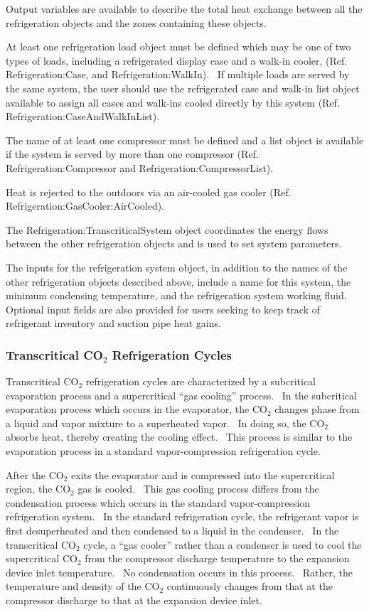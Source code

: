 Output variables are available to describe the total heat exchange between all the refrigeration objects and the zones containing these objects.

At least one refrigeration load object must be defined which may be one of two types of loads, including a refrigerated display case and a walk-in cooler, (Ref. Refrigeration:Case, and Refrigeration:WalkIn).~ If multiple loads are served by the same system, the user should use the refrigerated case and walk-in list object available to assign all cases and walk-ins cooled directly by this system (Ref. Refrigeration:CaseAndWalkInList).

The name of at least one compressor must be defined and a list object is available if the system is served by more than one compressor (Ref. Refrigeration:Compressor and Refrigeration:CompressorList).

Heat is rejected to the outdoors via an air-cooled gas cooler (Ref. Refrigeration:GasCooler:AirCooled).

The Refrigeration:TranscriticalSystem object coordinates the energy flows between the other refrigeration objects and is used to set system parameters.

The inputs for the refrigeration system object, in addition to the names of the other refrigeration objects described above, include a name for this system, the minimum condensing temperature, and the refrigeration system working fluid.~ Optional input fields are also provided for users seeking to keep track of refrigerant inventory and suction pipe heat gains.

\subsubsection{Transcritical CO\(_{2}\) Refrigeration Cycles}\label{transcritical-co2-refrigeration-cycles}

Transcritical CO\(_{2}\) refrigeration cycles are characterized by a subcritical evaporation process and a supercritical ``gas cooling'' process.~ In the subcritical evaporation process which occurs in the evaporator, the CO\(_{2}\) changes phase from a liquid and vapor mixture to a superheated vapor.~ In doing so, the CO\(_{2}\) absorbs heat, thereby creating the cooling effect.~ This process is similar to the evaporation process in a standard vapor-compression refrigeration cycle.

After the CO\(_{2}\) exits the evaporator and is compressed into the supercritical region, the CO\(_{2}\) gas is cooled.~ This gas cooling process differs from the condensation process which occurs in the standard vapor-compression refrigeration system.~ In the standard refrigeration cycle, the refrigerant vapor is first desuperheated and then condensed to a liquid in the condenser.~ In the transcritical CO\(_{2}\) cycle, a ``gas cooler'' rather than a condenser is used to cool the supercritical CO\(_{2}\) from the compressor discharge temperature to the expansion device inlet temperature.~ No condensation occurs in this process.~ Rather, the temperature and density of the CO\(_{2}\) continuously changes from that at the compressor discharge to that at the expansion device inlet.

